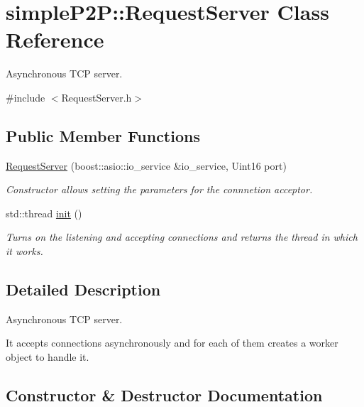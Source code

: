 \hypertarget{classsimpleP2P_1_1RequestServer}{}\section{simple\+P2P\+:\+:Request\+Server Class Reference}
\label{classsimpleP2P_1_1RequestServer}


Asynchronous T\+CP server.  




{\ttfamily \#include $<$Request\+Server.\+h$>$}

\subsection*{Public Member Functions}
\begin{DoxyCompactItemize}
\item 
\hyperlink{classsimpleP2P_1_1RequestServer_a86343d987d50c62c361ec9f74a6caab6}{Request\+Server} (boost\+::asio\+::io\+\_\+service \&io\+\_\+service, Uint16 port)
\begin{DoxyCompactList}\small\item\em Constructor allows setting the parameters for the connnetion acceptor. \end{DoxyCompactList}\item 
\mbox{\label{classsimpleP2P_1_1RequestServer_a6a111e7a8ca8e7d94cc5f70382379bc7}} 
std\+::thread \hyperlink{classsimpleP2P_1_1RequestServer_a6a111e7a8ca8e7d94cc5f70382379bc7}{init} ()
\begin{DoxyCompactList}\small\item\em Turns on the listening and accepting connections and returns the thread in which it works. \end{DoxyCompactList}\end{DoxyCompactItemize}


\subsection{Detailed Description}
Asynchronous T\+CP server. 

It accepts connections asynchronously and for each of them creates a worker object to handle it. 

\subsection{Constructor \& Destructor Documentation}
\mbox{\label{classsimpleP2P_1_1RequestServer_a86343d987d50c62c361ec9f74a6caab6}} 
